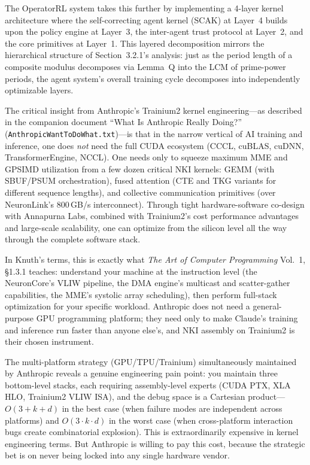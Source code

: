 \documentclass[12pt]{article}
\newcommand{\SBUF}{\textsc{SBUF}}                 %
\newcommand{\PSUM}{\textsc{PSUM}}                 %
\newcommand{\MME}{\textsc{MME}}                   %
\newcommand{\GPSIMD}{\textsc{GPSIMD}}             %
\begin{document}
The OperatorRL system takes this further by implementing a 4-layer kernel architecture where the self-correcting agent kernel (SCAK) at Layer~4 builds upon the policy engine at Layer~3, the inter-agent trust protocol at Layer~2, and the core primitives at Layer~1. This layered decomposition mirrors the hierarchical structure of Section~3.2.1's analysis: just as the period length of a composite modulus decomposes via Lemma~Q into the LCM of prime-power periods, the agent system's overall training cycle decomposes into independently optimizable layers.

The critical insight from Anthropic's Trainium2 kernel engineering---as described in the companion document ``What Is Anthropic Really Doing?'' (\texttt{AnthropicWantToDoWhat.txt})---is that in the narrow vertical of AI training and inference, one does \emph{not} need the full CUDA ecosystem (CCCL, cuBLAS, cuDNN, TransformerEngine, NCCL). One needs only to squeeze maximum \MME{} and \GPSIMD{} utilization from a few dozen critical NKI kernels: GEMM (with \SBUF{}/\PSUM{} orchestration), fused attention (CTE and TKG variants for different sequence lengths), and collective communication primitives (over NeuronLink's 800\,GB/s interconnect). Through tight hardware-software co-design with Annapurna Labs, combined with Trainium2's cost performance advantages and large-scale scalability, one can optimize from the silicon level all the way through the complete software stack.

In Knuth's terms, this is exactly what \emph{The Art of Computer Programming} Vol.~1, \S1.3.1 teaches: understand your machine at the instruction level (the NeuronCore's VLIW pipeline, the DMA engine's multicast and scatter-gather capabilities, the \MME{}'s systolic array scheduling), then perform full-stack optimization for your specific workload. Anthropic does not need a general-purpose GPU programming platform; they need only to make Claude's training and inference run faster than anyone else's, and NKI assembly on Trainium2 is their chosen instrument.

The multi-platform strategy (GPU/TPU/Trainium) simultaneously maintained by Anthropic reveals a genuine engineering pain point: you maintain three bottom-level stacks, each requiring assembly-level experts (CUDA PTX, XLA HLO, Trainium2 VLIW ISA), and the debug space is a Cartesian product---$O(3 + k + d)$ in the best case (when failure modes are independent across platforms) and $O(3 \cdot k \cdot d)$ in the worst case (when cross-platform interaction bugs create combinatorial explosion). This is extraordinarily expensive in kernel engineering terms. But Anthropic is willing to pay this cost, because the strategic bet is on never being locked into any single hardware vendor.
\end{document}
